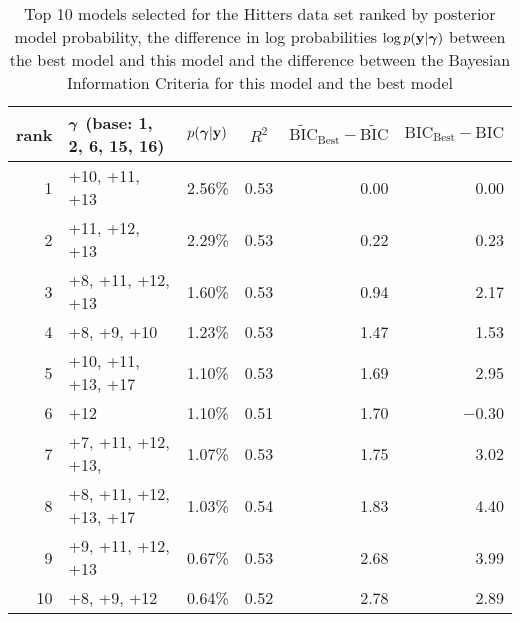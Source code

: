 \documentclass{article}[12pt]
\begin{document}
\begin{table}
	\label{tab:numerical_results_hitters}
	\caption{Top 10 models selected for the Hitters data set ranked by posterior model probability, the difference
		in log probabilities $\log p({\bf y}|{\boldsymbol \gamma})$ between the best model and this model and the difference
		between the Bayesian Information Criteria for this model and the best model}
	\begin{center}
		\begin{tabular}{r|l|l|c|r|r}
			rank & ${\boldsymbol \gamma}$ (base: 1, 2, 6, 15, 16) & $p({\boldsymbol \gamma}|{\bf y})$ & $R^2$ & $\widetilde{\text{BIC}}_\text{Best} - \widetilde{\text{BIC}}$ & $\text{BIC}_\text{Best} - \text{BIC}$ \\
			\hline
			1  &  +10, +11, +13&  2.56\%&  0.53&  0.00&  0.00\\
			2  &  +11, +12, +13&  2.29\%&  0.53&  0.22&  0.23\\
			3  &  +8, +11, +12, +13&  1.60\%&  0.53&  0.94&  2.17\\
			4  &  +8, +9, +10&  1.23\%&  0.53&  1.47&  1.53\\
			5  &  +10, +11, +13, +17&  1.10\%&  0.53&  1.69&  2.95\\
			6  &  +12&  1.10\%&  0.51&  1.70&  $-$0.30\\
			7  &  +7, +11, +12, +13,&  1.07\%&  0.53&  1.75&  3.02\\
			8  &  +8, +11, +12, +13, +17&  1.03\%&  0.54&  1.83&  4.40\\
			9  &  +9, +11, +12, +13&  0.67\%&  0.53&  2.68&  3.99\\
			10 &  +8, +9, +12&  0.64\%&  0.52&  2.78&  2.89\\
		\end{tabular}
	\end{center}
\end{table}
\end{document}
